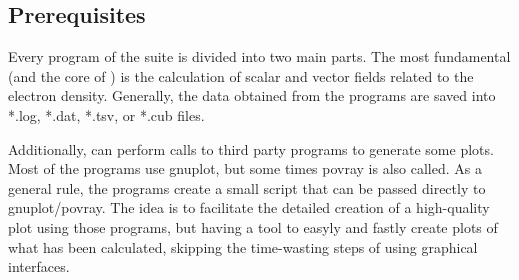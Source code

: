 \subsection{Prerequisites}

Every program of the suite \DTK{} is divided into two main parts. The most fundamental (and the core of \DTK) is the calculation of scalar and vector fields related to the electron density. Generally, the data obtained from the programs are saved into *.log, *.dat, *.tsv, or *.cub files. 

Additionally, \DTK{} can perform calls to third party programs to generate some plots. Most of the programs use gnuplot, but some times povray is also called. As a general rule, the programs create a small script that can be passed directly to gnuplot/povray. The idea is to facilitate the detailed creation of a high-quality plot using those programs, but having a tool to easyly and fastly create plots of what has been calculated, skipping the time-wasting steps of using graphical interfaces.

